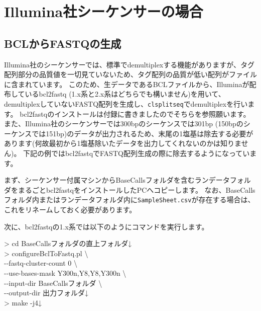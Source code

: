 \documentclass[titlepage,10pt,a4paper]{jsbook}
\newenvironment{cmd}{\begin{oframed}\raggedright\ttfamily\footnotesize\setlength{\baselineskip}{1.4em}}{\end{oframed}\vspace{-1em}}
\begin{document}
\section{Illumina社シーケンサーの場合}

\subsection{BCLからFASTQの生成}

Illumina社のシーケンサーでは、標準でdemultiplexする機能がありますが、タグ配列部分の品質値を一切見ていないため、タグ配列の品質が低い配列がファイルに含まれています。
このため、生データであるBCLファイルから、Illuminaが配布しているbcl2fastq (1.x系と2.x系はどちらでも構いません)を用いて、demultiplexしていないFASTQ配列を生成し、\texttt{clsplitseq}でdemultiplexを行います。
bcl2fastqのインストールは付録に書きましたのでそちらを参照願います。
また、Illumina社のシーケンサーでは300bpのシーケンスでは301bp (150bpのシーケンスでは151bp)のデータが出力されるため、末尾の1塩基は除去する必要があります(何故最初から1塩基除いたデータを出力してくれないのかは知りません)。
下記の例ではbcl2fastqでFASTQ配列生成の際に除去するようになっています。

まず、シーケンサー付属マシンからBaseCallsフォルダを含むランデータフォルダをまるごとbcl2fastqをインストールしたPCへコピーします。
なお、BaseCallsフォルダ内またはランデータフォルダ内に\texttt{SampleSheet.csv}が存在する場合は、これをリネームしておく必要があります。

次に、bcl2fastqの1.x系では以下のようにコマンドを実行します。

\begin{cmd}
{\textgreater} cd BaseCallsフォルダの直上フォルダ↓\\
{\textgreater} configureBclToFastq.pl {\textbackslash}\\
{-}{-}fastq-cluster-count 0 {\textbackslash}\\
{-}{-}use-bases-mask Y300n,Y8,Y8,Y300n {\textbackslash}\\
{-}{-}input-dir BaseCallsフォルダ {\textbackslash}\\
{-}{-}output-dir 出力フォルダ↓\\
{\textgreater} make -j4↓
\end{cmd}
\end{document}
